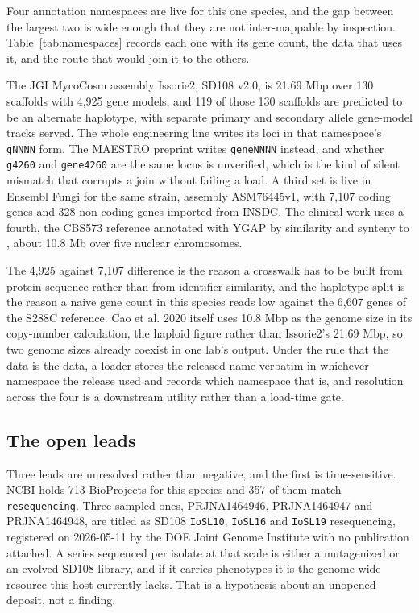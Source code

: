 Four annotation namespaces are live for this one species, and the gap between the largest two
is wide enough that they are not inter-mappable by inspection. Table~\ref{tab:namespaces}
records each one with its gene count, the data that uses it, and the route that would join it
to the others.

The JGI MycoCosm assembly Issorie2, SD108 v2.0, is 21.69 Mbp over 130 scaffolds with 4,925
gene models, and 119 of those 130 scaffolds are predicted to be an alternate haplotype, with
separate primary and secondary allele gene-model tracks served. The whole engineering line
writes its loci in that namespace's \texttt{gNNNN} form. The MAESTRO preprint writes
\texttt{geneNNNN} instead, and whether \texttt{g4260} and \texttt{gene4260} are the same locus
is unverified, which is the kind of silent mismatch that corrupts a join without failing a
load. A third set is live in Ensembl Fungi for the same strain, assembly ASM76445v1, with 7,107
coding genes and 328 non-coding genes imported from INSDC. The clinical work uses a fourth,
the CBS573 reference annotated with YGAP by similarity and synteny to ,
about 10.8 Mb over five nuclear chromosomes.

The 4,925 against 7,107 difference is the reason a crosswalk has to be built from protein
sequence rather than from identifier similarity, and the haplotype split is the reason a naive
gene count in this species reads low against the 6,607 genes of the S288C reference. Cao et al.
2020 itself uses 10.8 Mbp as the genome size in its copy-number calculation, the haploid figure
rather than Issorie2's 21.69 Mbp, so two genome sizes already coexist in one lab's output. Under
the rule that the data is the data, a loader stores the released name verbatim in whichever
namespace the release used and records which namespace that is, and resolution across the four
is a downstream utility rather than a load-time gate.



\subsection{The open leads}\label{sec:pk-leads}

Three leads are unresolved rather than negative, and the first is time-sensitive. NCBI holds
713 BioProjects for this species and 357 of them match \texttt{resequencing}. Three sampled
ones, PRJNA1464946, PRJNA1464947 and PRJNA1464948, are titled as  SD108 \texttt{IoSL10}, \texttt{IoSL16} and \texttt{IoSL19} resequencing,
registered on 2026-05-11 by the DOE Joint Genome Institute with no publication attached. A
series sequenced per isolate at that scale is either a mutagenized or an evolved SD108
library, and if it carries phenotypes it is the genome-wide resource this host currently
lacks. That is a hypothesis about an unopened deposit, not a finding.

